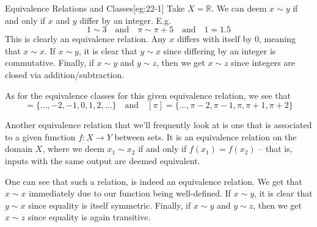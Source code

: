 \begin{egBox}{Equivalence Relations and Classes}[eg:22-1]
    Take \( X = \mathbb{R} \).
    We can deem \( x \sim y \) if and only if \( x \) and \( y \) differ by an
    integer.
    E.g.
    \begin{equation*}
        1 \sim 3
        \quad \mathrm{and} \quad 
        \pi \sim \pi + 5    
        \quad \mathrm{and} \quad 
        1 \not\sim 1.5
    \end{equation*}
    This is clearly an equivalence relation.
    Any \( x \) differs with itself by \( 0 \), meaning that \( x \sim x \).
    If \( x \sim y \), it is clear that \( y \sim x \) since differing by an 
    integer is commutative.
    Finally, if \( x \sim y \) and \( y \sim z \), then we get \( x \sim z \)
    since integers are closed via addition/subtraction.

    \baseSkip

    As for the equivalence classes for this given equivalence relation, we see 
    that 
    \begin{equation*}
        [ 1 ]
        =
        \{ \ldots, -2, -1, 0, 1, 2, \ldots \}
        \quad \mathrm{and} \quad 
        [ \pi ]
        =
        \{ \ldots, \pi - 2, \pi - 1, \pi, \pi + 1, \pi + 2 \}
    \end{equation*}

    \baseRule

    Another equivalence relation that we'll frequently look at is one that is 
    associated to a given function \( f: X \rightarrow Y \) between sets.
    It is an equivalence relation on the domain \( X \), where we deem 
    \( x_{ 1 } \sim x_{ 2 } \) if and only if \( f ( x_{ 1 } ) = 
    f ( x_{ 2 } ) \) -- that is, inputs with the same output are deemed 
    equivalent.

    \baseSkip 

    One can see that such a relation, is indeed an equivalence relation.
    We get that \( x \sim x \) immediately due to our function being
    well-defined.
    If \( x \sim y \), it is clear that \( y \sim x \) since equality is 
    itself symmetric.
    Finally, if \( x \sim y \) and \( y \sim z \), then we get \( x \sim z \)
    since equality is again transitive.
\end{egBox}

